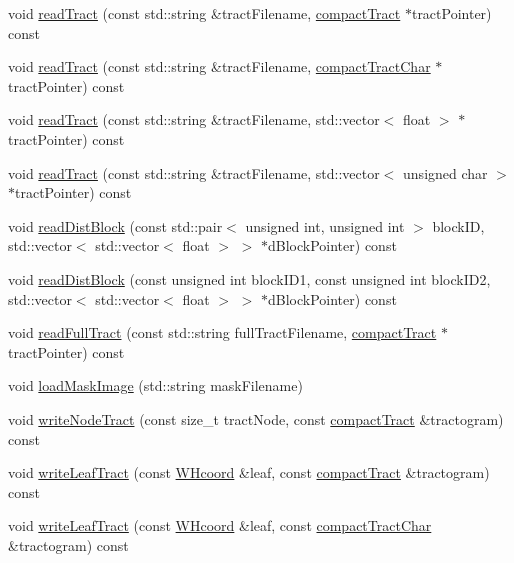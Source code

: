 \begin{DoxyCompactItemize}
\item 
void \hyperlink{classfileManager_a88cd843c970cfb52f11138c74eac3195}{read\-Tract} (const std\-::string \&tract\-Filename, \hyperlink{classcompactTract}{compact\-Tract} $\ast$tract\-Pointer) const 
\item 
void \hyperlink{classfileManager_aa9b0f571bf6244d2e4037572a5d68507}{read\-Tract} (const std\-::string \&tract\-Filename, \hyperlink{classcompactTractChar}{compact\-Tract\-Char} $\ast$tract\-Pointer) const 
\item 
void \hyperlink{classfileManager_af58861a36229bbdc5b74e2cc36dd6488}{read\-Tract} (const std\-::string \&tract\-Filename, std\-::vector$<$ float $>$ $\ast$tract\-Pointer) const 
\item 
void \hyperlink{classfileManager_a31d73123ba9e43b2fcafc9985725c47e}{read\-Tract} (const std\-::string \&tract\-Filename, std\-::vector$<$ unsigned char $>$ $\ast$tract\-Pointer) const 
\item 
void \hyperlink{classfileManager_af81791803dc1116fb55343d070169d1d}{read\-Dist\-Block} (const std\-::pair$<$ unsigned int, unsigned int $>$ block\-I\-D, std\-::vector$<$ std\-::vector$<$ float $>$ $>$ $\ast$d\-Block\-Pointer) const 
\item 
void \hyperlink{classfileManager_a74fc943b2fb2275a209f1470bc55c9d7}{read\-Dist\-Block} (const unsigned int block\-I\-D1, const unsigned int block\-I\-D2, std\-::vector$<$ std\-::vector$<$ float $>$ $>$ $\ast$d\-Block\-Pointer) const 
\item 
void \hyperlink{classfileManager_a96e9ac0dffda9bcd02bba97be94635d6}{read\-Full\-Tract} (const std\-::string full\-Tract\-Filename, \hyperlink{classcompactTract}{compact\-Tract} $\ast$tract\-Pointer) const 
\item 
void \hyperlink{classfileManager_a047394d444e2a33def35515da8daebb4}{load\-Mask\-Image} (std\-::string mask\-Filename)
\item 
void \hyperlink{classfileManager_add95d10a2323eda445a150304300837c}{write\-Node\-Tract} (const size\-\_\-t tract\-Node, const \hyperlink{classcompactTract}{compact\-Tract} \&tractogram) const 
\item 
void \hyperlink{classfileManager_a08443609e35b7b5e7123cc57d32b2870}{write\-Leaf\-Tract} (const \hyperlink{classWHcoord}{\-W\-Hcoord} \&leaf, const \hyperlink{classcompactTract}{compact\-Tract} \&tractogram) const 
\item 
void \hyperlink{classfileManager_a8244ce5c46d19ac66edac97bdb907c16}{write\-Leaf\-Tract} (const \hyperlink{classWHcoord}{\-W\-Hcoord} \&leaf, const \hyperlink{classcompactTractChar}{compact\-Tract\-Char} \&tractogram) const 

\end{DoxyCompactItemize}
